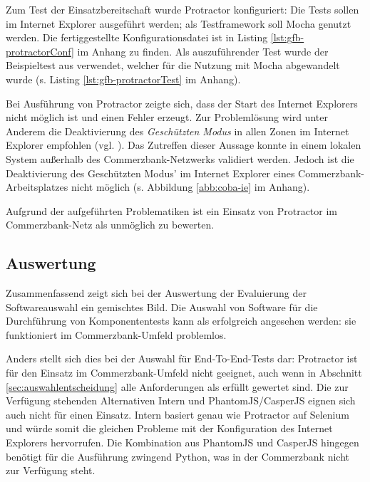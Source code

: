 Zum Test der Einsatzbereitschaft wurde Protractor konfiguriert: Die Tests sollen im Internet Explorer ausgeführt werden; als Testframework soll Mocha genutzt werden. Die fertiggestellte Konfigurationsdatei ist in Listing \ref{lst:gfb-protractorConf} im Anhang zu finden. Als auszuführender Test wurde der Beispieltest aus \cite{protractor-index} verwendet, welcher für die Nutzung mit Mocha abgewandelt wurde (s. Listing \ref{lst:gfb-protractorTest} im Anhang).

Bei Ausführung von Protractor zeigte sich, dass der Start des Internet Explorers nicht möglich ist und einen Fehler erzeugt. Zur Problemlösung wird unter Anderem die Deaktivierung des \textit{Geschützten Modus} in allen Zonen im Internet Explorer empfohlen (vgl. \cite{bug-ie-1, bug-ie-2}). Das Zutreffen dieser Aussage konnte in einem lokalen System außerhalb des Commerzbank-Netzwerks validiert werden. Jedoch ist die Deaktivierung des Geschützten Modus' im Internet Explorer eines Commerzbank-Arbeitsplatzes nicht möglich (s. Abbildung \ref{abb:coba-ie} im Anhang).

Aufgrund der aufgeführten Problematiken ist ein Einsatz von Protractor im Commerzbank-Netz als unmöglich zu bewerten.

\subsection{Auswertung}
Zusammenfassend zeigt sich bei der Auswertung der Evaluierung der Softwareauswahl ein gemischtes Bild. Die Auswahl von Software für die Durchführung von Komponententests kann als erfolgreich angesehen werden: sie funktioniert im Commerzbank-Umfeld problemlos.

Anders stellt sich dies bei der Auswahl für End-To-End-Tests dar: Protractor ist für den Einsatz im Commerzbank-Umfeld nicht geeignet, auch wenn in Abschnitt \ref{sec:auswahlentscheidung} alle Anforderungen als erfüllt gewertet sind. Die zur Verfügung stehenden Alternativen Intern und PhantomJS/CasperJS eignen sich auch nicht für einen Einsatz. Intern basiert genau wie Protractor auf Selenium und würde somit die gleichen Probleme mit der Konfiguration des Internet Explorers hervorrufen. Die Kombination aus PhantomJS und CasperJS hingegen benötigt für die Ausführung zwingend Python, was in der Commerzbank nicht zur Verfügung steht.